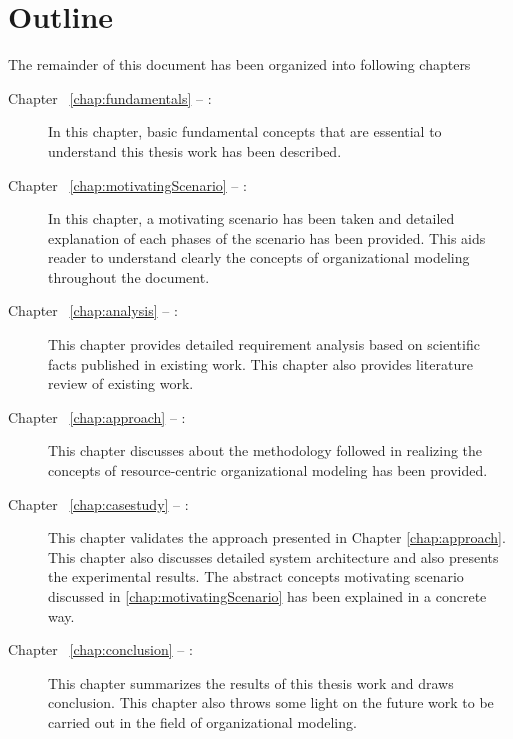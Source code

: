 \section {Outline}
\label{sec:outline}
The remainder of this document has been organized into following chapters
\begin{description}
	\item[Chapter ~\ref{chap:fundamentals} -- :] In this chapter, basic fundamental concepts that are essential to understand this thesis work has been described.
	\item[Chapter ~\ref{chap:motivatingScenario} -- :] In this chapter, a motivating scenario has been taken and detailed explanation of each phases of the scenario has been provided. This aids reader to understand clearly the concepts of organizational modeling throughout the document. 
	\item[Chapter ~\ref{chap:analysis} -- :] This chapter provides detailed requirement analysis based on scientific facts published in existing work. This chapter also provides literature review of existing work.
	\item[Chapter ~\ref{chap:approach} -- :] This chapter discusses about the methodology followed in realizing the concepts  of resource-centric organizational modeling has been provided.
	\item[Chapter ~\ref{chap:casestudy} -- :] This chapter validates the approach presented in Chapter \ref{chap:approach}. This chapter also discusses detailed system architecture and also presents the experimental results. The abstract concepts motivating scenario discussed in \ref{chap:motivatingScenario} has been explained in a concrete way.	
	\item[Chapter ~\ref{chap:conclusion} -- :] This chapter summarizes  the results of this thesis work and draws conclusion. This chapter also throws some light on the future work to be carried out in the field of organizational modeling. 
\end{description}